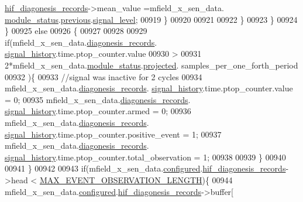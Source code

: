 \begin{DoxyCode}
{{      \hyperlink{a00021_ae18294f7499d9fcb5ec796a1816b8cd8}{hif\_diagonesis\_records}->mean\_value =mfield\_x\_sen\_data.
      \hyperlink{a00025_adfab5a5d8b45a93dfb13edb24e2b80e3}{module\_status}.\hyperlink{a00019_adcb859b2f3983a9c58deab28e59c333f}{previous}.\hyperlink{a00019_a4070db8eab0ff93e3fbc1df59872f117}{signal\_level};
00919                        \}
00920 
00921 
00922                     \}
00923                    \}
00924                  \}
00925                  \textcolor{keywordflow}{else}
00926                  \{
00927 
00928 
00929                     \textcolor{keywordflow}{if}(mfield\_x\_sen\_data.\hyperlink{a00025_a2bd79ce84bbd6b7f50d38954f7ae475e}{diagonesis\_records}.
      \hyperlink{a00019_ab7038f4de1f77b52a7f89e9f77c0b846}{signal\_history}.time.ptop\_counter.value
00930                     >
00931                     2*mfield\_x\_sen\_data.\hyperlink{a00025_adfab5a5d8b45a93dfb13edb24e2b80e3}{module\_status}.\hyperlink{a00019_af2267fb093fb5dcaa006a570a6da3b6b}{projected}.
      samples\_per\_one\_forth\_period
00932                     )\{
00933                        \textcolor{comment}{//signal was inactive for 2 cycles}
00934                        mfield\_x\_sen\_data.\hyperlink{a00025_a2bd79ce84bbd6b7f50d38954f7ae475e}{diagonesis\_records}.
      \hyperlink{a00019_ab7038f4de1f77b52a7f89e9f77c0b846}{signal\_history}.time.ptop\_counter.value = 0;
00935                        mfield\_x\_sen\_data.\hyperlink{a00025_a2bd79ce84bbd6b7f50d38954f7ae475e}{diagonesis\_records}.
      \hyperlink{a00019_ab7038f4de1f77b52a7f89e9f77c0b846}{signal\_history}.time.ptop\_counter.armed = 0;
00936                        mfield\_x\_sen\_data.\hyperlink{a00025_a2bd79ce84bbd6b7f50d38954f7ae475e}{diagonesis\_records}.
      \hyperlink{a00019_ab7038f4de1f77b52a7f89e9f77c0b846}{signal\_history}.time.ptop\_counter.positive\_event = 1;
00937                        mfield\_x\_sen\_data.\hyperlink{a00025_a2bd79ce84bbd6b7f50d38954f7ae475e}{diagonesis\_records}.
      \hyperlink{a00019_ab7038f4de1f77b52a7f89e9f77c0b846}{signal\_history}.time.ptop\_counter.total\_observation = 1;
00938 
00939                      \}
00940 
00941                  \}
00942 
00943                \textcolor{keywordflow}{if}(mfield\_x\_sen\_data.\hyperlink{a00025_a94b2d1f6ea4ab334c74d24984dd27843}{configured}.\hyperlink{a00021_ae18294f7499d9fcb5ec796a1816b8cd8}{hif\_diagonesis\_records}->head
       < \hyperlink{a00022_aa060aeb1ecb530b3c6f6d91060999b70}{MAX\_EVENT\_OBSERVATION\_LENGTH})\{
00944                mfield\_x\_sen\_data.\hyperlink{a00025_a94b2d1f6ea4ab334c74d24984dd27843}{configured}.\hyperlink{a00021_ae18294f7499d9fcb5ec796a1816b8cd8}{hif\_diagonesis\_records}->buffer[
}}
\end{DoxyCode}
